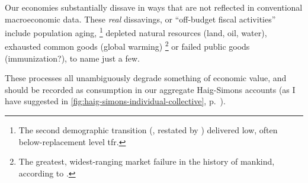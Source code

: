 Our economies substantially dissave in ways that are not reflected in conventional macroeconomic data.
These \emph{real} dissavings, or ``off-budget fiscal activities'' \cite[49]{Bonker2006} include population aging,
\footnote{
	The second demographic transition (\citealt{Davis1945}, restated by \citealt{Caldwell-1976-aa}) delivered low, often below-replacement level \gls{tfr}.
}
depleted natural resources (land, oil, water), exhausted common goods (global warming)
\footnote{
	The greatest, widest-ranging market failure in the history of mankind, according to \cite{Stern-2006-aa}.
}
or failed public goods (immunization?), to name just a few.

These processes all unambiguously degrade something of economic value, and should be recorded as consumption in our aggregate Haig-Simons accounts (as I have suggested in \autoref{fig:haig-simons-individual-collective}, p.~\pageref{fig:haig-simons-individual-collective}).

